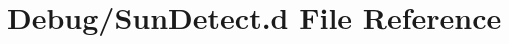 \hypertarget{_sun_detect_8d}{}\section{Debug/\+Sun\+Detect.d File Reference}
\label{_sun_detect_8d}
